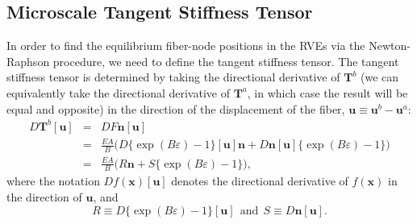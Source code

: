 \subsection{Microscale Tangent Stiffness Tensor}
\label{subsec:tangent_stiffness_tensor}

In order to find the equilibrium fiber-node positions in the RVEs via the Newton-Raphson procedure, we need to define the tangent stiffness tensor. The tangent stiffness tensor is determined by taking the directional derivative of $\textbf{T}^b$ (we can equivalently take the directional derivative of $\textbf{T}^a$, in which case the result will be equal and opposite) in the direction of the displacement of the fiber, $\textbf{u} \equiv \textbf{u}^b - \textbf{u}^a$:
%
\begin{eqnarray}
D\textbf{T}^b [\textbf{u}] &=& D F \textbf{n} [\textbf{u}] \nonumber\\
&=& \frac{E A}{B} \bigg(D \{ \exp(B \varepsilon) - 1\} [\textbf{u}] \textbf{n}+ D \textbf{n} [\textbf{u}] \{ \exp(B \varepsilon) - 1\} \bigg) \nonumber\\
&=& \frac{E A}{B} \bigg( R\textbf{n} + S\{\exp(B \varepsilon) - 1\} \bigg),
\label{DT_i}
\end{eqnarray}
%
where the notation $D f(\textbf{x}) [\textbf{u}]$ denotes the directional derivative of $f(\textbf{x})$ in the direction of $\textbf{u}$, and 
% 
\begin{equation}
R \equiv D \{ \exp(B \varepsilon) - 1\} [\textbf{u}] \ \ \text{and} \ \
S \equiv D \textbf{n} [\textbf{u}].
\end{equation}
%

